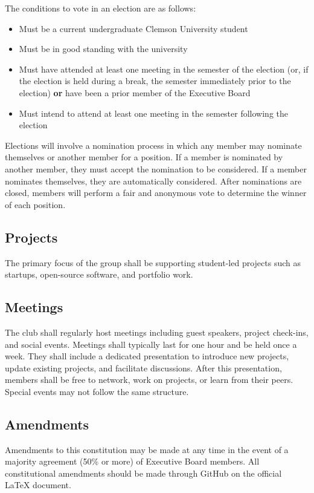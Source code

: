 \documentclass{article}
\begin{document}
The conditions to vote in an election are as follows:

\begin{itemize}
    \item Must be a current undergraduate Clemson University student
    \item Must be in good standing with the university
    \item Must have attended at least one meeting in the semester of the election (or, if the election is held during a break, the semester immediately prior to the election) \textbf{or} have been a prior member of the Executive Board
    \item Must intend to attend at least one meeting in the semester following the election
\end{itemize}

Elections will involve a nomination process in which any member may nominate themselves or another member for a position. If a member is nominated by another member, they must accept the nomination to be considered. If a member nominates themselves, they are automatically considered. After nominations are closed, members will perform a fair and anonymous vote to determine the winner of each position.

\subsection{Projects}
The primary focus of the group shall be supporting student-led projects such as startups, open-source software, and portfolio work. 

\subsection{Meetings}
The club shall regularly host meetings including guest speakers, project check-ins, and social events. Meetings shall typically last for one hour and be held once a week. They shall include a dedicated presentation to introduce new projects, update existing projects, and facilitate discussions. After this presentation, members shall be free to network, work on projects, or learn from their peers. Special events may not follow the same structure. 

\subsection{Amendments}
Amendments to this constitution may be made at any time in the event of a majority agreement (50\% or more) of Executive Board members. All constitutional amendments should be made through GitHub on the official \LaTeX{ }document.
\end{document}
